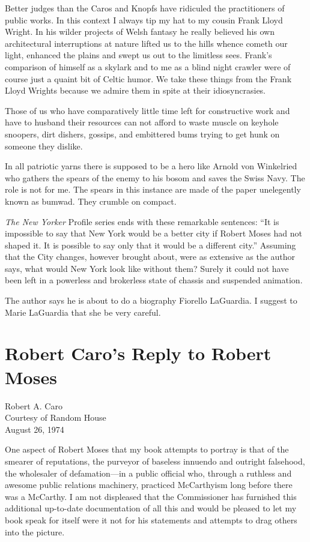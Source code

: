 \documentclass[11pt,letterpaper]{article}
\begin{document}
Better judges than the Caros and Knopfs have ridiculed the practitioners of public works. In this context I always tip my hat to my cousin Frank Lloyd Wright. In his wilder projects of Welsh fantasy he really believed his own architectural interruptions at nature lifted us to the hills whence cometh our light, enhanced the plains and swept us out to the limitless sees. Frank's comparison of himself as a skylark and to me as a blind night crawler were of course just a quaint bit of Celtic humor. We take these things from the Frank Lloyd Wrights because we admire them in spite at their idiosyncrasies.

Those of us who have comparatively little time left for constructive work and have to husband their resources can not afford to waste muscle on keyhole snoopers, dirt dishers, gossips, and embittered bums trying to get hunk on someone they dislike.

In all patriotic yarns there is supposed to be a hero like Arnold von Winkelried who gathers the spears of the enemy to his bosom and saves the Swiss Navy. The role is not for me. The spears in this instance are made of the paper unelegently known as bumwad. They crumble on compact.

\textit{The New Yorker} Profile series ends with these remarkable sentences: \enquote{It is impossible to say that New York would be a better city if Robert Moses had not shaped it. It is possible to say only that it would be a different city.} Assuming that the City changes, however brought about, were as extensive as the author says, what would New York look like without them? Surely it could not have been left in a powerless and brokerless state of chassis and suspended animation.

The author says he is about to do a biography Fiorello LaGuardia. I suggest to Marie LaGuardia that she be very careful.

\newpage

\section*{Robert Caro's Reply to Robert Moses}

\noindent Robert A. Caro\\
\noindent Courtesy of Random House\\
\noindent August 26, 1974
\vspace{1cm}

\noindent One aspect of Robert Moses that my book attempts to portray is that of the smearer of reputations, the purveyor of baseless innuendo and outright falsehood, the wholesaler of defamation---in a public official who, through a ruthless and awesome public relations machinery, practiced McCarthyism long before there was a McCarthy. I am not displeased that the Commissioner has furnished this additional up-to-date documentation of all this and would be pleased to let my book speak for itself were it not for his statements and attempts to drag others into the picture.
\end{document}
